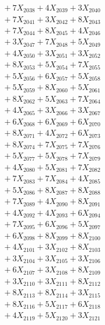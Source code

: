 \documentclass[a4paper,10pt]{article}
\begin{document}
{\begin{align}
&\;  + 7 X_{2038} + 4 X_{2039} + 3 X_{2040} \\[0.3ex]
&\;  + 7 X_{2041} + 3 X_{2042} + 8 X_{2043} \\[0.3ex]
&\;  + 7 X_{2044} + 8 X_{2045} + 4 X_{2046} \\[0.3ex]
&\;  + 3 X_{2047} + 7 X_{2048} + 5 X_{2049} \\[0.5ex]\allowbreak
&\;  + 4 X_{2050} + 3 X_{2051} + 3 X_{2052} \\[0.3ex]
&\;  + 8 X_{2053} + 5 X_{2054} + 7 X_{2055} \\[0.3ex]
&\;  + 5 X_{2056} + 6 X_{2057} + 5 X_{2058} \\[0.3ex]
&\;  + 5 X_{2059} + 8 X_{2060} + 5 X_{2061} \\[0.3ex]
&\;  + 8 X_{2062} + 5 X_{2063} + 7 X_{2064} \\[0.3ex]
&\;  + 4 X_{2065} + 3 X_{2066} + 3 X_{2067} \\[0.3ex]
&\;  + 6 X_{2068} + 6 X_{2069} + 6 X_{2070} \\[0.3ex]
&\;  + 8 X_{2071} + 4 X_{2072} + 6 X_{2073} \\[0.3ex]
&\;  + 8 X_{2074} + 7 X_{2075} + 7 X_{2076} \\[0.3ex]
&\;  + 5 X_{2077} + 5 X_{2078} + 7 X_{2079} \\[0.5ex]\allowbreak
&\;  + 4 X_{2080} + 5 X_{2081} + 7 X_{2082} \\[0.3ex]
&\;  + 7 X_{2083} + 7 X_{2084} + 4 X_{2085} \\[0.3ex]
&\;  + 5 X_{2086} + 8 X_{2087} + 8 X_{2088} \\[0.3ex]
&\;  + 7 X_{2089} + 4 X_{2090} + 8 X_{2091} \\[0.3ex]
&\;  + 4 X_{2092} + 4 X_{2093} + 6 X_{2094} \\[0.3ex]
&\;  + 7 X_{2095} + 6 X_{2096} + 5 X_{2097} \\[0.3ex]
&\;  + 6 X_{2098} + 8 X_{2099} + 8 X_{2100} \\[0.3ex]
&\;  + 4 X_{2101} + 3 X_{2102} + 8 X_{2103} \\[0.3ex]
&\;  + 3 X_{2104} + 3 X_{2105} + 3 X_{2106} \\[0.3ex]
&\;  + 6 X_{2107} + 3 X_{2108} + 8 X_{2109} \\[0.5ex]\allowbreak
&\;  + 3 X_{2110} + 3 X_{2111} + 8 X_{2112} \\[0.3ex]
&\;  + 8 X_{2113} + 8 X_{2114} + 3 X_{2115} \\[0.3ex]
&\;  + 8 X_{2116} + 5 X_{2117} + 6 X_{2118} \\[0.3ex]
&\;  + 4 X_{2119} + 5 X_{2120} + 3 X_{2121} \\[0.3ex]

\end{align}}
\end{document}
